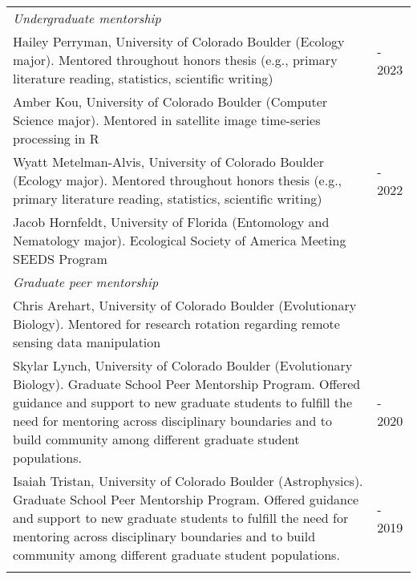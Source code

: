 \begin{longtable}{@{}>{\raggedright}p{5.25in} >{\raggedleft}X@{}}
 \addlinespace[1ex]
 
\emph{Undergraduate mentorship}  & \tabularnewline
Hailey Perryman, University of Colorado Boulder (Ecology major). Mentored throughout honors thesis (e.g., primary literature reading, statistics, scientific writing)  & 2022 - 2023 \tabularnewline
Amber Kou, University of Colorado Boulder (Computer Science major). Mentored in satellite image time-series processing in R & 2022 \tabularnewline
Wyatt Metelman-Alvis, University of Colorado Boulder (Ecology major). Mentored throughout honors thesis (e.g., primary literature reading, statistics, scientific writing)  & 2021 - 2022 \tabularnewline
Jacob Hornfeldt, University of Florida (Entomology and Nematology major). Ecological Society of America Meeting SEEDS Program & 2020  \tabularnewline
 \addlinespace[1ex]
 
\emph{Graduate peer mentorship}  & \tabularnewline
Chris Arehart, University of Colorado Boulder (Evolutionary Biology). Mentored for research rotation regarding remote sensing data manipulation & 2021 \tabularnewline
Skylar Lynch, University of Colorado Boulder (Evolutionary Biology). Graduate School Peer Mentorship Program. Offered guidance and support to new graduate students to fulfill the need for mentoring across disciplinary boundaries and to build community among different graduate student populations. & 2019 - 2020 \tabularnewline
Isaiah Tristan, University of Colorado Boulder (Astrophysics). Graduate School Peer Mentorship Program. Offered guidance and support to new graduate students to fulfill the need for mentoring across disciplinary boundaries and to build community among different graduate student populations.  & 2018 - 2019  \tabularnewline
 \addlinespace[1ex]
 

\end{longtable}


